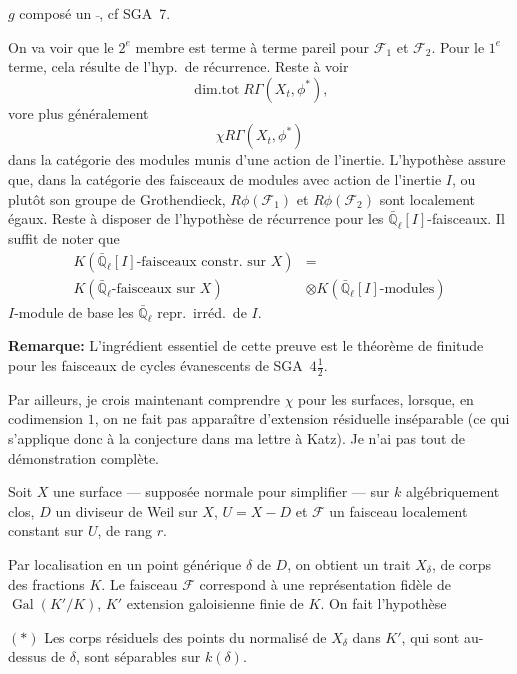 \documentclass[11pt,a4paper]{article}
\theoremstyle{plain}
\theoremstyle{definition}
\DeclareMathOperator{\dimtot}{dim.tot}
\DeclareMathOperator{\Gal}{Gal}
\begin{document}
$g$ compos\'e un $\bar{}$, cf SGA~7.

On va voir que le $2^e$ membre est terme \`a terme pareil pour $\mathcal{F}_1$ et $\mathcal{F}_2$. Pour le $1^e$ terme, cela r\'esulte de l'hyp.\ de r\'ecurrence. Reste \`a voir
\[
\dimtot R\Gamma(X_t, \phi^*),
\]
vore plus g\'en\'eralement
\[
\chi R\Gamma(X_t, \phi^*)
\]
dans la cat\'egorie des modules munis d'une action de l'inertie. L'hypoth\`ese assure que, dans la cat\'egorie des faisceaux de modules avec action de l'inertie $I$, ou plut\^ot son groupe de Grothendieck, $R\phi(\mathcal{F}_1)$ et $R\phi(\mathcal{F}_2)$ sont localement \'egaux. Reste \`a disposer de l'hypoth\`ese de r\'ecurrence pour les $\bar{\mathbb{Q}}_\ell[I]$-faisceaux. Il suffit de noter que
\begin{align*}
K(\bar{\mathbb{Q}}_\ell[I]\text{-faisceaux constr.\ sur } X) &= \\
K(\bar{\mathbb{Q}}_\ell\text{-faisceaux sur } X) &\otimes K(\bar{\mathbb{Q}}_\ell[I]\text{-modules})
\end{align*}
$I$-module de base les $\bar{\mathbb{Q}}_\ell$ repr.\ irr\'ed.\ de $I$.

\newpage

\noindent \textbf{Remarque:} L'ingr\'edient essentiel de cette preuve est le th\'eor\`eme de finitude pour les faisceaux de cycles \'evanescents de SGA~$4\frac{1}{2}$.

\bigskip

Par ailleurs, je crois maintenant comprendre $\chi$ pour les surfaces, lorsque, en codimension $1$, on ne fait pas appara\^itre d'extension r\'esiduelle ins\'eparable (ce qui s'applique donc \`a la conjecture dans ma lettre \`a Katz). Je n'ai pas tout de d\'emonstration compl\`ete.

Soit $X$ une surface --- suppos\'ee normale pour simplifier --- sur $k$ alg\'ebriquement clos, $D$ un diviseur de Weil sur $X$, $U = X - D$ et $\mathcal{F}$ un faisceau localement constant sur $U$, de rang $r$.

\medskip

Par localisation en un point g\'en\'erique $\delta$ de $D$, on obtient un trait $X_\delta$, de corps des fractions $K$. Le faisceau $\mathcal{F}$ correspond \`a une repr\'esentation fid\`ele de $\Gal(K'/K)$, $K'$ extension galoisienne finie de $K$. On fait l'hypoth\`ese

\medskip

$(*)$ Les corps r\'esiduels des points du normalis\'e de $X_\delta$ dans $K'$, qui sont au-dessus de $\delta$, sont s\'eparables sur $k(\delta)$.
\end{document}
